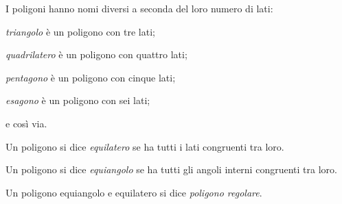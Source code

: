 I poligoni hanno nomi diversi a seconda del loro numero di lati:
\begin{itemize*}
\item \emph{triangolo} è un poligono con tre lati;
\item \emph{quadrilatero} è un poligono con quattro lati;
\item \emph{pentagono} è un poligono con cinque lati;
\item \emph{esagono} è un poligono con sei lati;
\item e così via.
\end{itemize*}

\begin{definizione}
Un poligono si dice \emph{equilatero} se ha tutti i lati congruenti 
tra loro.
\end{definizione}

\begin{definizione}
Un poligono si dice \emph{equiangolo} se ha tutti gli angoli interni 
congruenti tra loro.
\end{definizione}

\begin{definizione}
Un poligono equiangolo e equilatero si dice \emph{poligono regolare}.
\end{definizione}

\ovalbox{\risolvii \ref{ese:1.125}, \ref{ese:1.126}, \ref{ese:1.127}, 
\ref{ese:1.128}, \ref{ese:1.129}, \ref{ese:1.130}, \ref{ese:1.131}, 
\ref{ese:1.132}, \ref{ese:1.133}, \ref{ese:1.134}}



